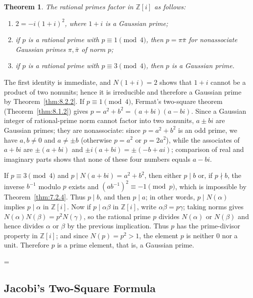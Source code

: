 \documentclass[11pt]{article}
\makeatletter
\theoremstyle{ntstyle}
\newtheorem{theorem}{Theorem}[subsection]
\let\nt@closedisplay\]
\def\nt@guardedclose{\@ifnextchar\par{\nt@closeafterpar}{\@ifnextchar\end{\postdisplaypenalty\@M\nt@closedisplay}{\nt@closedisplay}}}
\def\nt@closeafterpar\par{\@ifnextchar\par{\nt@closeafterpar}{\@ifnextchar\end{\postdisplaypenalty\@M\nt@closedisplay\par}{\nt@closedisplay\par}}}
\renewenvironment{proof}[1][\proofname]{\par
  \pushQED{\qed}\normalfont\topsep\medskipamount\edef\nt@afterproof{\@endparpenalty=\the\@endparpenalty\relax}\@beginparpenalty\@M\@endparpenalty\@M\let\]\nt@guardedclose\trivlist\item[]\textit{#1\@addpunct{.}} \ignorespaces}{\ifvmode\addpenalty\@M\fi\popQED\nt@afterproof\endtrivlist\@endpefalse}
\makeatother
\begin{document}
\begin{theorem}\label{thm:8.2.3}
	The rational primes factor in $\mathbb{Z}[i]$ as follows:
	\begin{enumerate}[label={\alph*)}]
		\item $2=-i(1+i)^2$, where $1+i$ is a Gaussian prime;
		\item if $p$ is a rational prime with $p\equiv1\pmod{4}$, then $p=\pi\bar\pi$ for nonassociate
		      Gaussian primes $\pi,\bar\pi$ of norm $p$;
		\item if $p$ is a rational prime with $p\equiv3\pmod{4}$, then $p$ is a Gaussian prime.
	\end{enumerate}

\end{theorem}

\begin{proof} The first identity is immediate, and $N(1+i)=2$ shows that
	$1+i$ cannot be a product of two nonunits; hence it is irreducible and
	therefore a Gaussian prime by Theorem~\ref{thm:8.2.2}. If
	$p\equiv1\pmod{4}$, Fermat's two-square theorem (Theorem~\ref{thm:8.1.2}) gives
	$p=a^2+b^2=(a+bi)(a-bi)$. Since a Gaussian integer of rational-prime
	norm cannot factor into two nonunits, $a\pm bi$ are Gaussian primes;
	they are nonassociate: since $p = a^2+b^2$ is an odd prime, we have
	$a,b\neq0$ and $a\neq\pm b$ (otherwise $p = a^2$ or $p = 2a^2$), while the
	associates of $a+bi$ are $\pm(a+bi)$ and $\pm i(a+bi) = \pm(-b+ai)$;
	comparison of real and imaginary parts shows that none of these four numbers equals
	$a-bi$.

	If $p\equiv3\pmod{4}$ and $p\mid N(a+bi)=a^2+b^2$, then either $p\mid b$
	or, if $p\nmid b$, the inverse $b^{-1}$ modulo $p$ exists and
	$(ab^{-1})^2\equiv-1\pmod{p}$, which is impossible by Theorem~\ref{thm:7.2.4}. Thus
	$p\mid b$, and then $p\mid a$; in other words, $p\mid N(\alpha)$
	implies $p\mid\alpha$ in $\mathbb{Z}[i]$. Now if $p\mid\alpha\beta$ in
	$\mathbb{Z}[i]$, write $\alpha\beta=p\gamma$; taking norms gives
	$N(\alpha)N(\beta)=p^2N(\gamma)$, so the rational prime $p$ divides
	$N(\alpha)$ or $N(\beta)$ and hence divides $\alpha$ or $\beta$ by the
	previous implication. Thus $p$ has the prime-divisor property in
	$\mathbb{Z}[i]$; and since $N(p)=p^2>1$, the element $p$ is neither $0$ nor a unit.
	Therefore $p$ is a prime element, that is, a Gaussian prime.

\end{proof}
\subsection{Jacobi's Two-Square Formula}
\end{document}
